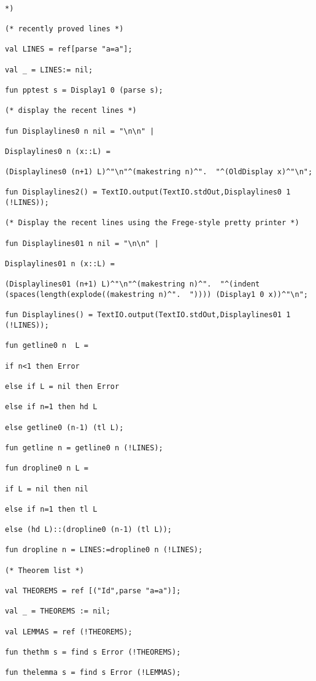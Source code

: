 \documentclass{article}
\begin{document}
{{\begin {verbatim}

*)

(* recently proved lines *)

val LINES = ref[parse "a=a"];

val _ = LINES:= nil;

fun pptest s = Display1 0 (parse s);

(* display the recent lines *)

fun Displaylines0 n nil = "\n\n" |

Displaylines0 n (x::L) =

(Displaylines0 (n+1) L)^"\n"^(makestring n)^".  "^(OldDisplay x)^"\n";

fun Displaylines2() = TextIO.output(TextIO.stdOut,Displaylines0 1 (!LINES));

(* Display the recent lines using the Frege-style pretty printer *)

fun Displaylines01 n nil = "\n\n" |

Displaylines01 n (x::L) =

(Displaylines01 (n+1) L)^"\n"^(makestring n)^".  "^(indent (spaces(length(explode((makestring n)^".  ")))) (Display1 0 x))^"\n";

fun Displaylines() = TextIO.output(TextIO.stdOut,Displaylines01 1 (!LINES));

fun getline0 n  L =

if n<1 then Error

else if L = nil then Error

else if n=1 then hd L

else getline0 (n-1) (tl L);

fun getline n = getline0 n (!LINES);

fun dropline0 n L =

if L = nil then nil

else if n=1 then tl L 

else (hd L)::(dropline0 (n-1) (tl L));

fun dropline n = LINES:=dropline0 n (!LINES);

(* Theorem list *)

val THEOREMS = ref [("Id",parse "a=a")];

val _ = THEOREMS := nil;

val LEMMAS = ref (!THEOREMS);

fun thethm s = find s Error (!THEOREMS);

fun thelemma s = find s Error (!LEMMAS);


\end{verbatim}}}
\end{document}
